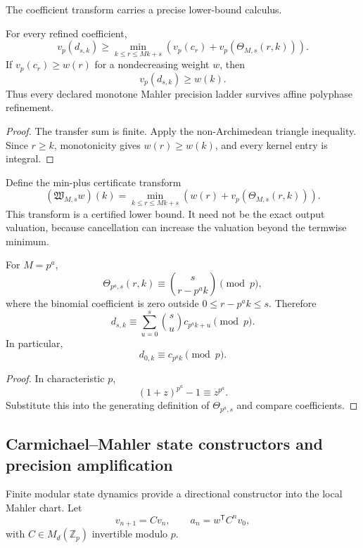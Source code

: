 The coefficient transform carries a precise lower-bound calculus.

\begin{theorem}
\label{thm:block08-valuation-ledger}
For every refined coefficient,
\[
 \boxed{
 v_p(d_{s,k})
 \geq
 \min_{k\leq r\leq Mk+s}
 \left(v_p(c_r)+v_p(\Theta_{M,s}(r,k))\right).}
\]
If \(v_p(c_r)\geq w(r)\) for a nondecreasing weight \(w\), then
\[
 \boxed{v_p(d_{s,k})\geq w(k).}
\]
Thus every declared monotone Mahler precision ladder survives affine polyphase refinement.
\end{theorem}

\begin{proof}
The transfer sum is finite.  Apply the non-Archimedean triangle inequality.  Since \(r\geq k\), monotonicity gives \(w(r)\geq w(k)\), and every kernel entry is integral.
\end{proof}

Define the min-plus certificate transform
\[
 \boxed{
 (\mathfrak W_{M,s}w)(k)
 =
 \min_{k\leq r\leq Mk+s}
 \left(w(r)+v_p(\Theta_{M,s}(r,k))\right).}
\]
This transform is a certified lower bound.  It need not be the exact output valuation, because cancellation can increase the valuation beyond the termwise minimum.

\begin{theorem}
\label{thm:block08-frobenius-sparsity}
For \(M=p^a\),
\[
 \boxed{
 \Theta_{p^a,s}(r,k)
 \equiv
 \binom{s}{r-p^ak}
 \pmod p,}
\]
where the binomial coefficient is zero outside \(0\leq r-p^ak\leq s\).  Therefore
\[
 \boxed{
 d_{s,k}
 \equiv
 \sum_{u=0}^{s}\binom su c_{p^ak+u}
 \pmod p.}
\]
In particular,
\[
 \boxed{d_{0,k}\equiv c_{p^ak}\pmod p.}
\]
\end{theorem}

\begin{proof}
In characteristic \(p\),
\[
 (1+z)^{p^a}-1\equiv z^{p^a}.
\]
Substitute this into the generating definition of \(\Theta_{p^a,s}\) and compare coefficients.
\end{proof}

\subsection{Carmichael--Mahler state constructors and precision amplification}
\label{subsec:block08-carmichael}

Finite modular state dynamics provide a directional constructor into the local Mahler chart.  Let
\[
 v_{n+1}=Cv_n,
 \qquad
 a_n=w^{\mathsf T}C^nv_0,
\]
with \(C\in M_d(\mathbb Z_p)\) invertible modulo \(p\).

